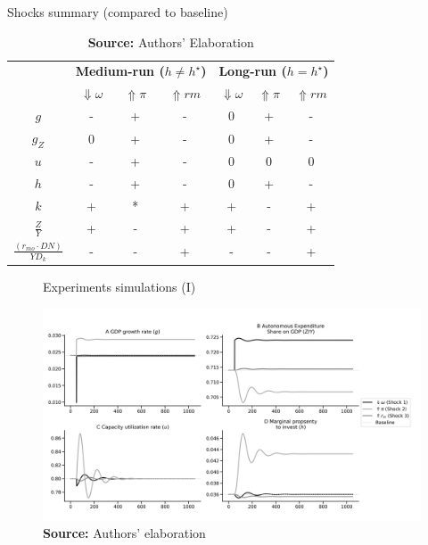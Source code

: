 \documentclass[11pt]{article}
\begin{document}
\begin{table}[H]
	\centering
	\caption{Shocks summary (compared to baseline)}
	\label{ResumoChoques}
		\begin{tabular}{c|c|c|c||c|c|c}
			\hline\hline
			\multirow{2}{*}{} & \multicolumn{3}{c||}{\textbf{Medium-run ($h \neq h^\star$)}} & \multicolumn{3}{c}{\textbf{Long-run ($h = h^\star$)}} \\ \cline{2-7} 
			&  \textbf{$\Downarrow \omega$} & \textbf{$\Uparrow \pi$} & \textbf{$\Uparrow rm$} &  \textbf{$\Downarrow \omega$} & \textbf{$\Uparrow \pi$} & \textbf{$\Uparrow rm$} \\ \hline
			\textbf{$g$}  & - & + & - & 0 & + & - \\ \hline
			\textbf{$g_Z$}  & 0 & + & -  & 0 & + & - \\ \hline
			\textbf{$u$}  & - & + & -  & 0 & 0 & 0 \\ \hline
			\textbf{$h$}  & - & + & -  & 0 & + & - \\ \hline
			\textbf{$k$}  & + & * & +  & + & - & + \\ \hline
			\textbf{$\frac{Z}{Y}$}  & + & - & +  & + & - & + \\ \hline
			\textit{$\frac{(r_{mo}\cdot DN)}{YD_k}$}  & - & - & +  & - & - & + \\ \hline\hline
		\end{tabular}%
	\caption*{\textbf{Source:} Authors' Elaboration}
\end{table}



\begin{figure}[htb]
	\centering
	\caption{Experiments simulations (I)}
	\label{fig:results_1}
	\includegraphics[width=.8\textwidth]{./figs/Compared_Shocks_1.png}
	\caption*{\textbf{Source:} Authors' elaboration}
\end{figure}
\end{document}
